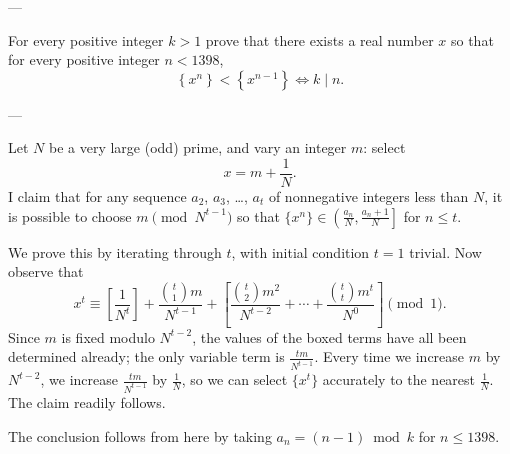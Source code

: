 
---

For every positive integer $k>1$ prove that there exists a real number $x$
so that for every positive integer $n<1398$,
\[\left\{x^n\right\}<\left\{x^{n-1}\right\}\iff k\mid n.\]

---

Let $N$ be a very large (odd) prime, and vary an integer $m$: select
\[x=m+\frac1N.\]
I claim that for any sequence $a_2$, $a_3$, \ldots, $a_t$ of nonnegative integers less than $N$, it is possible to choose $m\pmod{N^{t-1}}$ so that $\{x^n\}\in\left(\frac{a_n}N,\frac{a_n+1}N\right]$ for $n\le t$. 

We prove this by iterating through $t$, with initial condition $t=1$ trivial. Now observe that
\[x^t\equiv\left[\frac1{N^t}\right]+\frac{\binom t1m}{N^{t-1}}+\left[\frac{\binom t2m^2}{N^{t-2}}+\cdots+\frac{\binom ttm^t}{N^0}\right]\pmod1.\]
Since $m$ is fixed modulo $N^{t-2}$, the values of the boxed terms have all been determined already; the only variable term is $\frac{tm}{N^{t-1}}$. Every time we increase $m$ by $N^{t-2}$, we increase $\frac{tm}{N^{t-1}}$ by $\frac1N$, so we can select $\{x^t\}$ accurately to the nearest $\frac1N$. The claim readily follows.

The conclusion follows from here by taking $a_n=(n-1)\bmod k$ for $n\le1398$.

